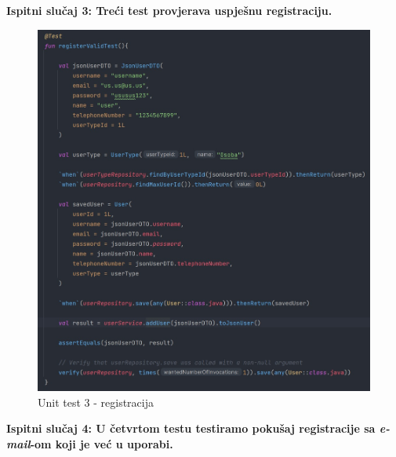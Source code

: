 \pagebreak		
\textbf{Ispitni slučaj 3: Treći test provjerava uspješnu registraciju.}

\begin{figure}[H]
			\includegraphics[scale=0.5]{slike/unit3.PNG} 
			\centering
			\caption{Unit test 3 - registracija}
			\label{pawBoost}
		\end{figure}
		
\pagebreak		
\textbf{Ispitni slučaj 4: U četvrtom testu testiramo pokušaj registracije sa \textit{e-mail}-om koji je već u uporabi.}

